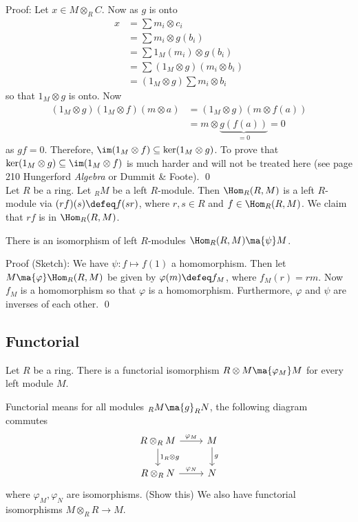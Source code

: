 Proof: Let $x \in M \otimes_R C$. Now as $g$ is onto
\[
\begin{split}
x&= \sum m_i \otimes c_i \\
&=\sum m_i \otimes g(b_i) \\
&=\sum 1_M(m_i) \otimes g(b_i) \\
&=\sum (1_M \otimes g)(m_i \otimes b_i) \\
&=(1_M \otimes g) \sum m_i \otimes b_i
\end{split}
\]
so that $1_M \otimes g$ is onto. Now
\[
\begin{split}
(1_M \otimes g)(1_M \otimes f)(m \otimes a)&=(1_M \otimes g)(m \otimes f(a)) \\
&=m \otimes \underbrace{g(f(a))}_{=0} =0
\end{split}
\]
as $gf=0$. Therefore, $\im(1_M \otimes f) \subseteq \ker(1_M \otimes g)$. To prove that $\ker(1_M \otimes g) \subseteq \im(1_M \otimes f)$ is much harder and will not be treated here (see page 210 Hungerford \emph{Algebra} or Dummit \& Foote). \qed \\

Let $R$ be a ring. Let $_R M$ be a left $R$-module. Then $\Hom_R(R,M)$ is a left $R$-module via $(rf)(s) \defeq f(sr)$, where $r,s \in R$ and $f \in \Hom_R(R,M)$. We claim that $rf$ is in $\Hom_R(R,M)$. 

\begin{prop}
There is an isomorphism of left $R$-modules $\Hom_R(R,M) \ma{\psi} M$. 
\end{prop}

Proof (Sketch): We have $\psi: f \mapsto f(1)$ a homomorphism. Then let $M \ma{\varphi} \Hom_R(R,M)$ be given by $\varphi(m) \defeq f_M$, where $f_M(r)=rm$. Now $f_M$ is a homomorphism so that $\varphi$ is a homomorphism. Furthermore, $\varphi$ and $\psi$ are inverses of each other. \qed \\

\subsection{Functorial} 

\begin{thm}
Let $R$ be a ring. There is a functorial isomorphism $R \otimes M \ma{\varphi_M} M$ for every left module $M$. 
\end{thm}

Functorial means for all modules $_R M \ma{g} _R N$, the following diagram commutes
\[
\begin{tikzcd}
R \otimes_R M \arrow{r}{\varphi_M} \arrow{d}{1_R \otimes g} & M \arrow{d}{g} \\
R \otimes_R N \arrow{r}{\varphi_N} & N 
\end{tikzcd}
\]
where $\varphi_M,\varphi_N$ are isomorphisms. (Show this) We also have functorial isomorphisms $M \otimes_R R \longrightarrow M$. 

